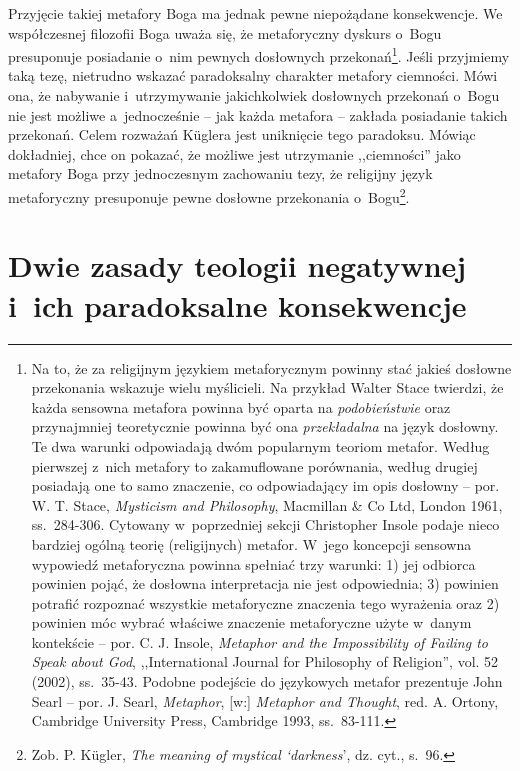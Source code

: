 Przyjęcie takiej metafory Boga ma jednak pewne niepożądane konsekwencje. We współczesnej filozofii Boga uważa się, że metaforyczny dyskurs o~Bogu presuponuje posiadanie o~nim pewnych dosłownych przekonań\footnote{Na to, że za religijnym językiem metaforycznym powinny stać jakieś dosłowne przekonania wskazuje wielu myślicieli. Na przykład Walter Stace twierdzi, że każda sensowna metafora powinna być oparta na \textit{podobieństwie} oraz przynajmniej teoretycznie powinna być ona \textit{przekładalna} na język dosłowny. Te dwa warunki odpowiadają dwóm popularnym teoriom metafor. Według pierwszej z~nich metafory to zakamuflowane porównania, według drugiej posiadają one to samo znaczenie, co odpowiadający im opis dosłowny -- por. W. T. Stace, \textit{Mysticism and Philosophy}, Macmillan \& Co Ltd, London 1961, ss.~284-306. Cytowany w~poprzedniej sekcji Christopher Insole podaje nieco bardziej ogólną teorię (religijnych) metafor. W~jego koncepcji sensowna wypowiedź metaforyczna powinna spełniać trzy warunki: 1) jej odbiorca powinien pojąć, że dosłowna interpretacja nie jest odpowiednia; 3) powinien potrafić rozpoznać wszystkie metaforyczne znaczenia tego wyrażenia oraz 2) powinien móc wybrać właściwe znaczenie metaforyczne użyte w~danym kontekście -- por. C. J. Insole, \textit{Metaphor and the Impossibility of Failing to Speak about God}, ,,International Journal for Philosophy of Religion'', vol. 52 (2002), ss.~35-43. Podobne podejście do językowych metafor prezentuje John Searl -- por. J. Searl, \textit{Metaphor}, [w:] \textit{Metaphor and Thought}, red. A. Ortony, Cambridge University Press, Cambridge 1993, ss.~83-111.}. Jeśli przyjmiemy taką tezę, nietrudno wskazać paradoksalny charakter metafory ciemności. Mówi ona, że nabywanie i~utrzymywanie jakichkolwiek dosłownych przekonań o~Bogu nie jest możliwe a~jednocześnie -- jak każda metafora -- zakłada posiadanie takich przekonań. Celem rozważań Küglera jest uniknięcie tego paradoksu. Mówiąc dokładniej, chce on pokazać, że możliwe jest utrzymanie ,,ciemności'' jako metafory Boga przy jednoczesnym zachowaniu tezy, że religijny język metaforyczny presuponuje pewne dosłowne przekonania o~Bogu\footnote{Zob. P. Kügler, \textit{The meaning of mystical ‘darkness}', dz. cyt., s.~96.}.


\section{Dwie zasady teologii negatywnej i~ich paradoksalne konsekwencje}\label{sil-kug-zasady}

